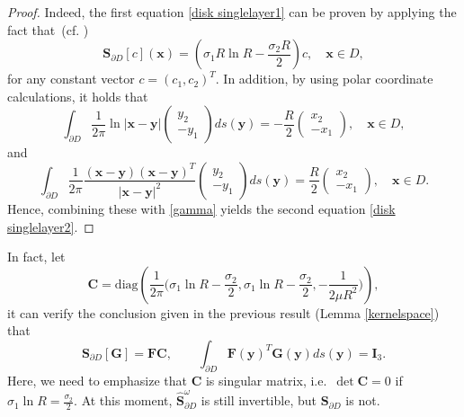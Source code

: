 \documentclass[10pt,reqno,oneside]{amsart}%
\theoremstyle{definition}
\theoremstyle{remark}
\numberwithin{equation}{section}
\numberwithin{equation}{section}
\begin{document}
\begin{proof}
Indeed, the first equation \eqref{disk singlelayer1} can be proven by applying the fact that~(cf. \cite{2018Kangelasticity})
$$
{\mathbf{S}}_{\partial D}[c](\mathbf{x})=\left(\sigma_1R\ln R-\frac{\sigma_2R}{2}\right)c, \quad \mathbf{x}\in D,
$$
for any constant vector $c=(c_1,c_2)^T$. In addition, by using polar coordinate calculations, it holds that
$$
\int_{\partial D} \frac{1}{2 \pi} \ln |\mathbf{x}-\mathbf{y}|
\begin{pmatrix}
y_2\\
-y_1
\end{pmatrix}
d s(\mathbf{y})=-\frac{R}{2}
\begin{pmatrix}
x_2\\
-x_1
\end{pmatrix},\quad \mathbf{x}\in D,
$$
and
$$
\int_{\partial D} \frac{1}{2 \pi}\frac{(\mathbf{x}-\mathbf{y})(\mathbf{x}-\mathbf{y})^T}{|\mathbf{x}-\mathbf{y}|^2}
\begin{pmatrix}
y_2\\
-y_1
\end{pmatrix}
d s(\mathbf{y})=\frac{R}{2}
\begin{pmatrix}
x_2\\
-x_1
\end{pmatrix},\quad \mathbf{x}\in D.
$$
Hence, combining these with \eqref{gamma} yields the second equation \eqref{disk singlelayer2}.
\end{proof}
In fact, let
$$
\mathbf{C}=\text{diag}\left(\frac{1}{2\pi}\Big(\sigma_1\ln R-\frac{\sigma_2}{2},\sigma_1\ln R-\frac{\sigma_2}{2},-\frac{1}{2\mu R^2}\Big)\right) ,
$$
it can verify the conclusion given in the previous result (Lemma \ref{kernelspace}) that
\begin{equation}
\mathbf{S}_{\partial D}[\mathbf{G}]=\mathbf{F}\mathbf{C},\quad \quad \int_{\partial D}\mathbf{F}(\mathbf{y})^T\mathbf{G}(\mathbf{y})d s(\mathbf{y})=\mathbf{I}_3.\nonumber
\end{equation}
Here, we need to emphasize that {$\mathbf{C}$ is singular matrix, i.e.~$\det\mathbf{C}= 0$ if $\sigma_1\ln R=\frac{\sigma_2}{2}$. At this moment, $\hat{\mathbf{S}}_{\partial D}^{\omega}$ is still invertible, but ${\mathbf{S}}_{\partial D}$ is not}.
\end{document}
